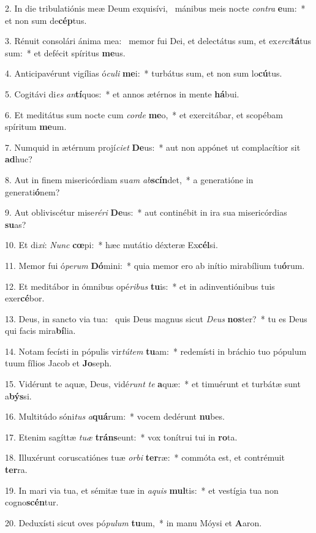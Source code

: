 2. In die tribulatiónis meæ Deum exquisívi, \dag\  mánibus meis nocte \textit{con}\textit{tra} \textbf{e}um:~*  et non sum de\textbf{cép}tus.\

3. Rénuit consolári ánima mea: \dag\  memor fui Dei, et delectátus sum, et ex\textit{er}\textit{ci}\textbf{tá}tus sum:~*  et defécit spíritus \textbf{me}us.\

4. Anticipavérunt vigílias ó\textit{cu}\textit{li} \textbf{me}i:~*  turbátus sum, et non sum lo\textbf{cú}tus.\

5. Cogitávi di\textit{es} \textit{an}\textbf{tí}quos:~*  et annos ætérnos in mente \textbf{há}bui.\

6. Et meditátus sum nocte cum \textit{cor}\textit{de} \textbf{me}o,~*  et exercitábar, et scopébam spíritum \textbf{me}um.\

7. Numquid in ætérnum projí\textit{ci}\textit{et} \textbf{De}us:~*  aut non appónet ut complacítior sit \textbf{ad}huc?\

8. Aut in finem misericórdiam su\textit{am} \textit{ab}\textbf{scín}det,~*  a generatióne in generati\textbf{ó}nem?\

9. Aut obliviscétur mise\textit{ré}\textit{ri} \textbf{De}us:~*  aut continébit in ira sua misericórdias \textbf{su}as?\

10. Et di\textit{xi}: \textit{Nunc} \textbf{cœ}pi:~*  hæc mutátio déxteræ Ex\textbf{cél}si.\

11. Memor fui ó\textit{pe}\textit{rum} \textbf{Dó}mini:~*  quia memor ero ab inítio mirabílium tu\textbf{ó}rum.\

12. Et meditábor in ómnibus opé\textit{ri}\textit{bus} \textbf{tu}is:~*  et in adinventiónibus tuis exer\textbf{cé}bor.\

13. Deus, in sancto via tua: \dag\  quis Deus magnus sicut \textit{De}\textit{us} \textbf{nos}ter?~*  tu es Deus qui facis mira\textbf{bí}lia.\

14. Notam fecísti in pópulis vir\textit{tú}\textit{tem} \textbf{tu}am:~*  redemísti in bráchio tuo pópulum tuum fílios Jacob et \textbf{Jo}seph.\

15. Vidérunt te aquæ, Deus, vidé\textit{runt} \textit{te} \textbf{a}quæ:~*  et timuérunt et turbátæ sunt a\textbf{býs}si.\

16. Multitúdo sóni\textit{tus} \textit{a}\textbf{quá}rum:~*  vocem dedérunt \textbf{nu}bes.\

17. Etenim sagíttæ \textit{tu}\textit{æ} \textbf{tráns}eunt:~*  vox tonítrui tui in \textbf{ro}ta.\

18. Illuxérunt coruscatiónes tuæ \textit{or}\textit{bi} \textbf{ter}ræ:~*  commóta est, et contrémuit \textbf{ter}ra.\

19. In mari via tua, et sémitæ tuæ in \textit{a}\textit{quis} \textbf{mul}tis:~*  et vestígia tua non cogno\textbf{scén}tur.\

20. Deduxísti sicut oves pó\textit{pu}\textit{lum} \textbf{tu}um,~*  in manu Móysi et \textbf{A}aron.\

